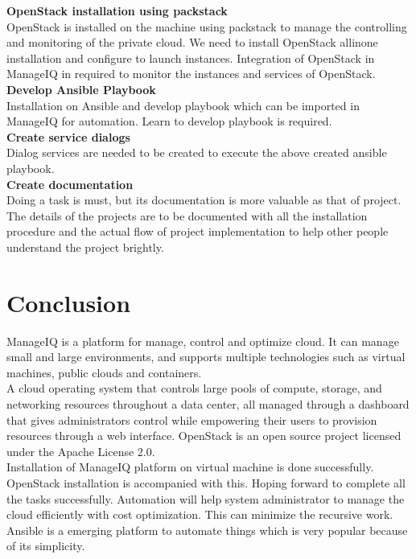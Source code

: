 \documentclass[a4paper,12pt]{report}
\begin{document}
\textbf{OpenStack installation using packstack}\\
OpenStack is installed on the machine using packstack to manage the controlling and monitoring of the private cloud. We need to install OpenStack allinone installation and configure to launch instances. Integration of OpenStack in ManageIQ in required to monitor the instances and services of OpenStack.\\

\textbf{Develop Ansible Playbook}\\
Installation on Ansible and develop playbook which can be imported in ManageIQ for automation. Learn to develop playbook is required.\\

\textbf{Create service dialogs}\\
Dialog services are needed to be created to execute the above created ansible playbook.\\

\textbf{Create documentation}\\
Doing a task is must, but its documentation is more valuable as that of project. The details of the projects are to be documented with all the installation procedure and the actual flow of project implementation to help other people understand the project brightly.\\

\chapter{Conclusion}

ManageIQ is a platform for manage, control and optimize cloud. It can manage small and large environments, and supports multiple technologies such as virtual machines, public clouds and containers.\\

A cloud operating system that controls large pools of compute, storage, and networking resources throughout a data center, all managed through a dashboard that gives administrators control while empowering their users to provision resources through a web interface. OpenStack is an open source project licensed under the Apache License 2.0.\\
    
Installation of ManageIQ platform on virtual machine is done successfully. OpenStack installation is accompanied with this. Hoping forward to complete all the tasks successfully. Automation will help system administrator to manage the cloud efficiently with cost optimization. This can minimize the recursive work. Ansible is a emerging platform to automate things which is very popular because of its simplicity.
\end{document}
